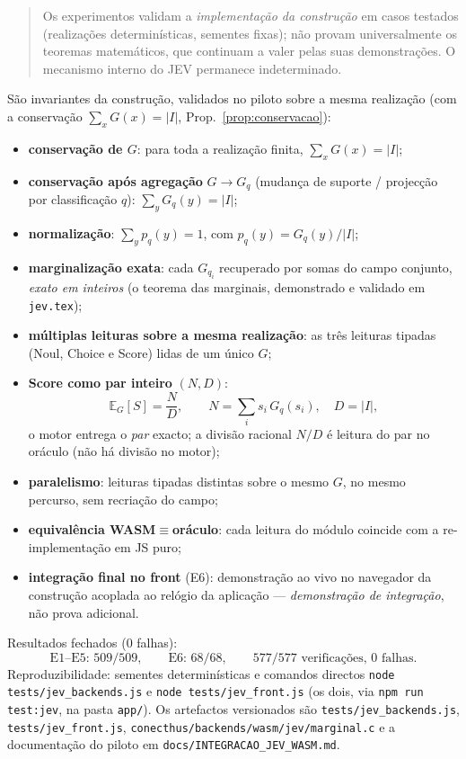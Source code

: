 \documentclass[11pt,a4paper]{article}
\newcommand{\code}[1]{\texttt{\small #1}}
\begin{document}
\begin{quote}
Os experimentos validam a \emph{implementação da construção} em casos
testados (realizações determinísticas, sementes fixas); não provam
universalmente os teoremas matemáticos, que continuam a valer pelas suas
demonstrações. O mecanismo interno do JEV permanece indeterminado.
\end{quote}

São invariantes da construção, validados no piloto sobre a mesma realização
(com a conservação \(\sum_x G(x)=\lvert I\rvert\),
Prop.~\ref{prop:conservacao}):
\begin{itemize}[leftmargin=1.5em]
\item \textbf{conservação de \(G\)}: para toda a realização finita,
      \(\sum_x G(x)=\lvert I\rvert\);
\item \textbf{conservação após agregação} \(G\to G_q\) (mudança de suporte /
      projecção por classificação \(q\)): \(\sum_y G_q(y)=\lvert I\rvert\);
\item \textbf{normalização}: \(\sum_y p_q(y)=1\), com
      \(p_q(y)=G_q(y)/\lvert I\rvert\);
\item \textbf{marginalização exata}: cada \(G_{q_i}\) recuperado por somas do
      campo conjunto, \emph{exato em inteiros} (o teorema das marginais,
      demonstrado e validado em \texttt{jev.tex});
\item \textbf{múltiplas leituras sobre a mesma realização}: as três leituras
      tipadas (Noul, Choice e Score) lidas de um único \(G\);
\item \textbf{Score como par inteiro} \((N,D)\):
      \[
      \boxed{\mathbb E_G[S]=\frac{N}{D},\qquad
      N=\sum_i s_i\,G_q(s_i),\quad D=\lvert I\rvert,}
      \]
      o motor entrega o \emph{par} exacto; a divisão racional \(N/D\) é leitura
      do par no oráculo (não há divisão no motor);
\item \textbf{paralelismo}: leituras tipadas distintas sobre o mesmo \(G\), no
      mesmo percurso, sem recriação do campo;
\item \textbf{equivalência WASM$\equiv$oráculo}: cada leitura do módulo coincide com
      a re-implementação em JS puro;
\item \textbf{integração final no front} (E6): demonstração ao vivo no
      navegador da construção acoplada ao relógio da aplicação ---
      \emph{demonstração de integração}, não prova adicional.
\end{itemize}

Resultados fechados (0 falhas):
\[
\text{E1--E5: }509/509,\qquad\text{E6: }68/68,
\qquad
\boxed{577/577\text{ verificações, }0\text{ falhas}.}
\]
Reproduzibilidade: sementes determinísticas e comandos directos
\code{node tests/jev\_backends.js} e \code{node tests/jev\_front.js} (os dois,
via \code{npm run test:jev}, na pasta \code{app/}). Os artefactos versionados
são \code{tests/jev\_backends.js}, \code{tests/jev\_front.js},
\code{conecthus/backends/wasm/jev/marginal.c} e a documentação do piloto em
\code{docs/INTEGRACAO\_JEV\_WASM.md}.
\end{document}
